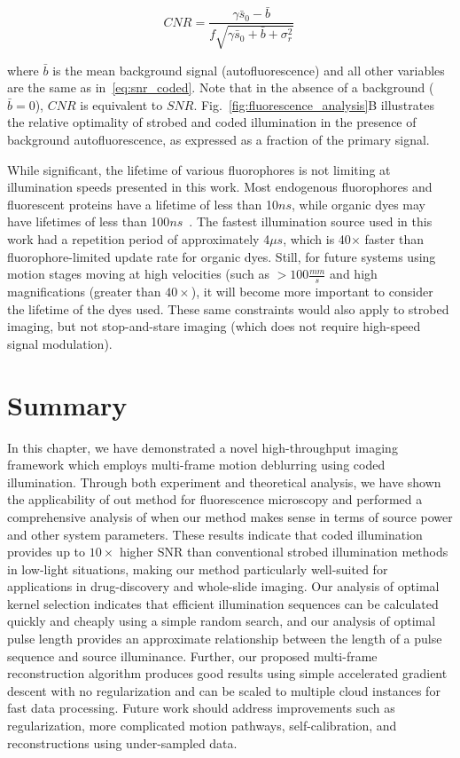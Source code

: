 \begin{equation}
    \label{eq:cnr}
    CNR  = \frac{\gamma\bar{s}_0 - \bar{b}}{f\sqrt{\gamma\bar{s}_0 + \bar{b} + \sigma^2_{r}}}\:
\end{equation}

\noindent where $\bar{b}$ is the mean background signal (autofluorescence) and all other variables are the same as in~\eqref{eq:snr_coded}. Note that in the absence of a background ($\bar{b} = 0$), $CNR$ is equivalent to $SNR$. Fig.~\ref{fig:fluorescence_analysis}B illustrates the relative optimality of strobed and coded illumination in the presence of background autofluorescence, as expressed as a fraction of the primary signal.

While significant, the lifetime of various fluorophores is not limiting at illumination speeds presented in this work. Most endogenous fluorophores and fluorescent proteins have a lifetime of less than 10$ns$, while organic dyes may have lifetimes of less than 100$ns$~\cite{fluorlifetime2010}. The fastest illumination source used in this work had a repetition period of approximately 4$\mu s$, which is 40$\times$ faster than fluorophore-limited update rate for organic dyes. Still, for future systems using motion stages moving at high velocities (such as $>100\frac{mm}{s}$ and high magnifications (greater than $40\times$), it will become more important to consider the lifetime of the dyes used. These same constraints would also apply to strobed imaging, but not stop-and-stare imaging (which does not require high-speed signal modulation).


\section{Summary}
In this chapter, we have demonstrated a novel high-throughput imaging framework which employs multi-frame motion deblurring using coded illumination. Through both experiment and theoretical analysis, we have shown the applicability of out method for fluorescence microscopy and performed a comprehensive analysis of when our method makes sense in terms of source power and other system parameters. These results indicate that coded illumination provides up to $10\times$ higher SNR than conventional strobed illumination methods in low-light situations, making our method particularly well-suited for applications in drug-discovery and whole-slide imaging. Our analysis of optimal kernel selection indicates that efficient illumination sequences can be calculated quickly and cheaply using a simple random search, and our analysis of optimal pulse length provides an approximate relationship between the length of a pulse sequence and source illuminance. Further, our proposed multi-frame reconstruction algorithm produces good results using simple accelerated gradient descent with no regularization and can be scaled to multiple cloud instances for fast data processing. Future work should address improvements such as regularization, more complicated motion pathways, self-calibration, and reconstructions using under-sampled data.
